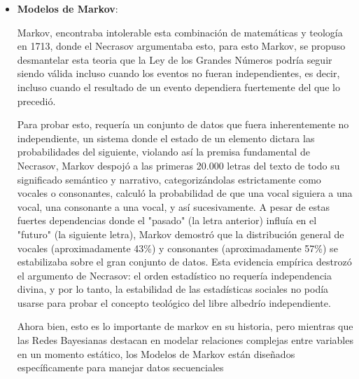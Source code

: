 \documentclass[letterpaper,12pt]{article}
\begin{document}
\begin{itemize}
    \textbf{Mencionar ventajas, limitaciones y contextos de aplicación:}
    Las redes Bayesianas tienen ventajas importantes entre las que se encuentra la capacidad de manejar variables discretas y continuas, combinar conocimiento experto con datos empíricos y representar distribuciones conjuntas complejas de manera compacta así que se podría decir que es un razonamiento eficiente bajo incertidumbre.
Como desventajas se tiene que su construcción exige un conocimiento profundo del dominio, y el cálculo exacto de probabilidades puede ser computacionalmente costoso en redes extensas y es por ello que Russell y Norvig (2004) advierten que “in the general case, the problem is intractable” (p. 552), lo que ha impulsado el desarrollo de métodos de inferencia aproximada para hacer viable su aplicación en sistemas de gran escala.

    \item \textbf{Modelos de Markov}:

    Markov, encontraba intolerable esta combinación de matemáticas y teología en 1713, donde el Necrasov argumentaba esto, para esto Markov, se propuso desmantelar esta teoria que la Ley de los Grandes Números podría seguir siendo válida incluso cuando los eventos no fueran independientes, es decir, incluso cuando el resultado de un evento dependiera fuertemente del que lo precedió.

     Para probar esto, requería un conjunto de datos que fuera inherentemente no independiente, un sistema donde el estado de un elemento dictara las probabilidades del siguiente, violando así la premisa fundamental de Necrasov, Markov despojó a las primeras 20.000 letras del texto de todo su significado semántico y narrativo, categorizándolas estrictamente como vocales o consonantes, calculó la probabilidad de que una vocal siguiera a una vocal, una consonante a una vocal, y así sucesivamente. A pesar de estas fuertes dependencias donde el "pasado" (la letra anterior) influía en el "futuro" (la siguiente letra), Markov demostró que la distribución general de vocales (aproximadamente 43\%) y consonantes (aproximadamente 57\%) se estabilizaba sobre el gran conjunto de datos. Esta evidencia empírica destrozó el argumento de Necrasov: el orden estadístico no requería independencia divina, y por lo tanto, la estabilidad de las estadísticas sociales no podía usarse para probar el concepto teológico del libre albedrío independiente. 

    Ahora bien, esto es lo importante de markov en su historia, pero mientras que las Redes Bayesianas destacan en modelar relaciones complejas entre variables en un momento estático, los Modelos de Markov están diseñados específicamente para manejar datos secuenciales


\end{itemize}
\end{document}
